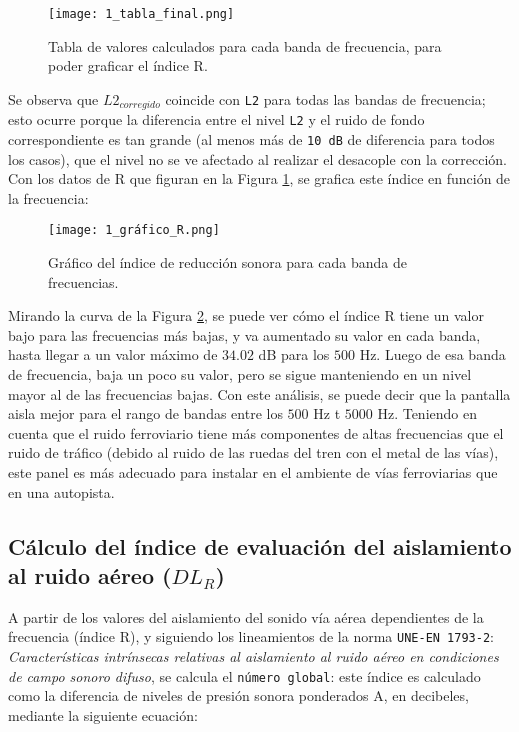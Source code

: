 		\begin{figure}[H]
			\centering
			\texttt{[image: 1\_tabla\_final.png]}\\
			\caption{Tabla de valores calculados para cada banda de frecuencia, para poder graficar el índice R.}
			\label{1_tabla_completa}
		\end{figure}
		
	Se observa que \texttt{$L2_{corregido}$} coincide con \texttt{L2} para todas las bandas de frecuencia; esto ocurre porque la diferencia entre el nivel \texttt{L2} y el ruido de fondo correspondiente es tan grande (al menos más de \texttt{10 dB} de diferencia para todos los casos), que el nivel no se ve afectado al realizar el desacople con la corrección. Con los datos de R que figuran en la Figura \ref{1_tabla_completa}, se grafica este índice en función de la frecuencia:
	
		\begin{figure}[H]
			\centering
			\texttt{[image: 1\_gráfico\_R.png]}\\
			\caption{Gráfico del índice de reducción sonora para cada banda de frecuencias.}
			\label{1_gráfico_R}
		\end{figure}
		
		Mirando la curva de la Figura \ref{1_gráfico_R}, se puede ver cómo el índice R tiene un valor bajo para las frecuencias más bajas, y va aumentado su valor en cada banda, hasta llegar a un valor máximo de $34.02$ dB para los $500$ Hz. Luego de esa banda de frecuencia, baja un poco su valor, pero se sigue manteniendo en un nivel mayor al de las frecuencias bajas. Con este análisis, se puede decir que la pantalla aisla mejor para el rango de bandas entre los $500$ Hz t $5000$ Hz. Teniendo en cuenta que el ruido ferroviario tiene más componentes de altas frecuencias que el ruido de tráfico (debido al ruido de las ruedas del tren con el metal de las vías), este panel es más adecuado para instalar en el ambiente de vías ferroviarias que en una autopista.
	
	\subsection{Cálculo del índice de evaluación del aislamiento al ruido aéreo ($DL_R$)}
	
	A partir de los valores del aislamiento del sonido vía aérea dependientes de la frecuencia (índice R), y siguiendo los lineamientos de la norma \texttt{UNE-EN 1793-2}: \textit{Características intrínsecas relativas al aislamiento al ruido aéreo en condiciones de campo sonoro difuso}, se calcula el \texttt{número global}: este índice es calculado como la diferencia de niveles de presión sonora ponderados A, en decibeles, mediante la siguiente ecuación:
	
